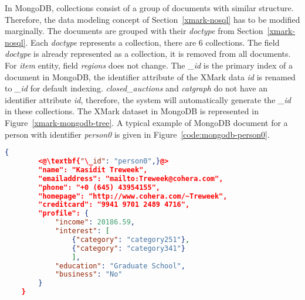 In MongoDB, collections consist of a group of documents with similar structure. Therefore, the data modeling concept of Section~\ref{xmark-nosql} has to be modified marginally. The documents are grouped with their \textit{doctype} from Section~\ref{xmark-nosql}. Each \textit{doctype} represents a collection, there are 6 collections. The field \textit{doctype} is already represented as a collection, it is removed from all documents.  
For \textit{item} entity,  field \textit{regions} does not change. The \textit{\_id} is the primary index of a document in MongoDB, the identifier attribute of the XMark data \textit{id} is renamed to \textit{\_id} for default indexing.  \textit{closed\_auctions} and \textit{catgraph} do not have an identifier attribute \textit{id}, therefore, the system will automatically generate the \textit{\_id} in these collections. The XMark dataset in MongoDB is represented in Figure~\ref{xmark-mongodb-tree}.
A typical example of MongoDB document for a person with identifier \textit{person0} is given in Figure~\ref{code:mongodb-person0}.	

\newbox\mongodbXmarkDocument
\begin{lrbox}{\mongodbXmarkDocument}
\begin{lstlisting}[language=JSON, basicstyle =\scriptsize]
    {
    	<@\textbf{"\_id": "person0",}@>
    	"name": "Kasidit Treweek",
    	"emailaddress": "mailto:Treweek@cohera.com",
    	"phone": "+0 (645) 43954155",
    	"homepage": "http://www.cohera.com/~Treweek",
    	"creditcard": "9941 9701 2489 4716",
    	"profile": {
    		"income": 20186.59,
    		"interest": [
    			{"category": "category251"},
    			{"category": "category341"}
    			],
    		"education": "Graduate School",
    		"business": "No"
    	}
    }
\end{lstlisting}
\end{lrbox}


\newbox\mongodbXmarkChart
\begin{lrbox}{\mongodbXmarkChart}
\end{lrbox}


